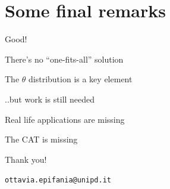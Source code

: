 \documentclass{beamer} %
\begin{document}
\section[Final remarks]{Some final remarks}

\begin{frame}


\begin{exampleblock}{Good!}
	
	There's no ``one-fits-all'' solution
	
		\vspace{2mm}
		
		 The $\theta$ distribution is a key element
\end{exampleblock}

\pause
\begin{alertblock}{..but work is still needed}
		
		Real life applications are missing
		
		The CAT is missing
\end{alertblock}

\end{frame}

\begin{frame}[plain]
	\vspace{2cm}
	\begin{center}
		\large{Thank you!}
		
		\vspace{3mm}
		\texttt{ottavia.epifania@unipd.it}
	\end{center}
\end{frame}
\end{document}
